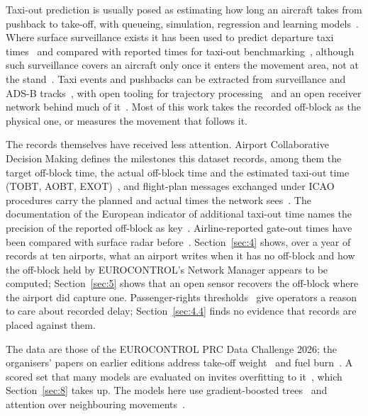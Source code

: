 \documentclass[
  manuscript=article,
  layout=preprint,
  year=2026,
  volume=x,
]{extra/joas}
\begin{document}
Taxi-out prediction is usually posed as estimating how long an aircraft takes from pushback to take-off, with queueing, simulation, regression and learning models~\cite{balakrishna2010accuracy,ravizza2013combined,herrema2018taxi}. Where surface surveillance exists it has been used to predict departure taxi times~\cite{srivastava2011improving,levy2008departure} and compared with reported times for taxi-out benchmarking~\cite{hotle2016using}, although such surveillance covers an aircraft only once it enters the movement area, not at the stand~\cite{hotle2016using}. Taxi events and pushbacks can be extracted from surveillance and ADS-B tracks~\cite{mirmohammadsadeghi2020taxi,stloukal2026analyzing,schultz2020analysis}, with open tooling for trajectory processing~\cite{olive2019traffic} and an open receiver network behind much of it~\cite{schafer2014bringing}. Most of this work takes the recorded off-block as the physical one, or measures the movement that follows it.

The records themselves have received less attention. Airport Collaborative Decision Making defines the milestones this dataset records, among them the target off-block time, the actual off-block time and the estimated taxi-out time (TOBT, AOBT, EXOT)~\cite{eurocontrol_acdm}, and flight-plan messages exchanged under ICAO procedures carry the planned and actual times the network sees~\cite{icao_doc4444}. The documentation of the European indicator of additional taxi-out time names the precision of the reported off-block as key~\cite{eurocontrol_atxot2023}. Airline-reported gate-out times have been compared with surface radar before~\cite{signor2006accurate}. Section~\ref{sec:4} shows, over a year of records at ten airports, what an airport writes when it has no off-block and how the off-block held by EUROCONTROL's Network Manager appears to be computed; Section~\ref{sec:5} shows that an open sensor recovers the off-block where the airport did capture one. Passenger-rights thresholds~\cite{ec261_2004} give operators a reason to care about recorded delay; Section~\ref{sec:4.4} finds no evidence that records are placed against them.

The data are those of the EUROCONTROL PRC Data Challenge 2026; the organisers' papers on earlier editions address take-off weight~\cite{spinielli2025takeoff} and fuel burn~\cite{sun2026fuel}. A scored set that many models are evaluated on invites overfitting to it~\cite{blum2015ladder,dwork2015reusable}, which Section~\ref{sec:8} takes up. The models here use gradient-boosted trees~\cite{ke2017lightgbm,chen2016xgboost,prokhorenkova2018catboost} and attention over neighbouring movements~\cite{vaswani2017attention}.
\end{document}
